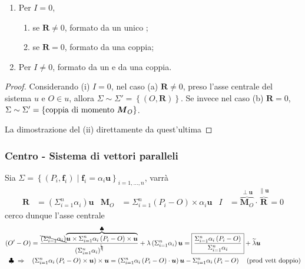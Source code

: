 \documentclass[a4paper,10pt]{article}
\theoremstyle{definition}
\theoremstyle{indentdefinition}
\theoremstyle{indenttheorem}
\theoremstyle{myremark}
\theoremstyle{indentgeneral}
\begin{document}
\begin{enumerate}
\item Per $I=0$,
\begin{enumerate}
\item se $\boldsymbol{R}\neq0$, formato da un unico ;
\item se $\boldsymbol{R}=0$, formato da una coppia;
\end{enumerate}
\item Per $I\neq0$, formato da un  e da
una coppia.
\end{enumerate}
\begin{proof}
Considerando (i) $I=0$, nel caso (a) $\boldsymbol{R}\neq0$, preso
l'asse centrale del sistema $u$ e $O\in u$, allora $\Sigma\sim\Sigma'=\left\{ \left(O,\boldsymbol{R}\right)\right\} $.
Se invece nel caso (b) $\boldsymbol{R}=0$, $\Sigma\sim\Sigma'=\left\{ \text{coppia di momento \ensuremath{\boldsymbol{M}_{O}}}\right\} $.

La dimostrazione del (ii) direttamente da quest'ultima
\end{proof}

\subsubsection{Centro  - Sistema di vettori paralleli}

Sia $\Sigma=\left\{ \left(P_{i},\boldsymbol{f}_{i}\right)\mid\boldsymbol{f}_{i}=\alpha_{i}\boldsymbol{u}\right\} _{i=1,\dots,n}$,
varrà
\begin{align*}
\boldsymbol{R} & =\left(\Sigma_{i=1}^{n}\alpha_{i}\right)\boldsymbol{u} & \boldsymbol{M}_{O} & =\Sigma_{i=1}^{n}\left(P_{i}-O\right)\times\alpha_{i}\boldsymbol{u} & I & =\overset{\perp\boldsymbol{u}}{\overbrace{\boldsymbol{M}_{O}}}\cdot\overset{\parallel\boldsymbol{u}}{\overbrace{\boldsymbol{R}}}=0
\end{align*}
cerco dunque l'asse centrale
\begin{align*}
\left(O'-O\right) & =\frac{\bcancel{\left(\Sigma_{i=1}^{n}\alpha_{i}\right)}\overset{\clubsuit}{\overbrace{\boldsymbol{u}\times\Sigma_{i=1}^{n}\alpha_{i}\left(P_{i}-O\right)\times\boldsymbol{u}}}}{\left(\Sigma_{i=1}^{n}\alpha_{i}\right)^{\bcancel{2}}}+\lambda\left(\Sigma_{i=1}^{n}\alpha_{i}\right)\boldsymbol{u}=\boxed{\frac{\Sigma_{i=1}^{n}\alpha_{i}\left(P_{i}-O\right)}{\Sigma_{i=1}^{n}\alpha_{i}}}+\widetilde{\lambda}\boldsymbol{u}\\
\clubsuit\;\Rightarrow\quad & \left(\Sigma_{i=1}^{n}\alpha_{i}\left(P_{i}-O\right)\times\boldsymbol{u}\right)\times\boldsymbol{u}=\left(\Sigma_{i=1}^{n}\alpha_{i}\left(P_{i}-O\right)\cdot\boldsymbol{u}\right)\boldsymbol{u}-\Sigma_{i=1}^{n}\alpha_{i}\left(P_{i}-O\right)\quad\text{(prod vett doppio)}
\end{align*}
\end{document}
